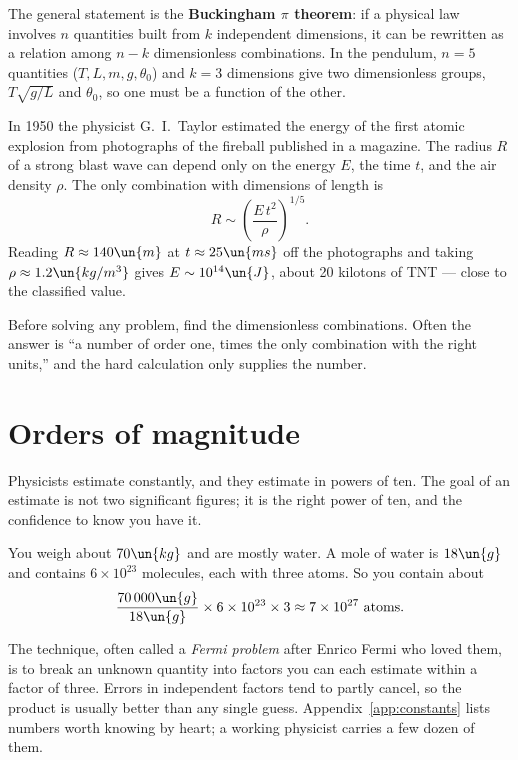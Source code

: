 The general statement is the \textbf{Buckingham $\pi$ theorem}: if a physical law involves $n$ quantities built from $k$ independent dimensions, it can be rewritten as a relation among $n-k$ dimensionless combinations. In the pendulum, $n=5$ quantities ($T, L, m, g, \theta_0$) and $k=3$ dimensions give two dimensionless groups, $T\sqrt{g/L}$ and $\theta_0$, so one must be a function of the other.

\begin{example}
In 1950 the physicist G.~I.~Taylor estimated the energy of the first atomic explosion from photographs of the fireball published in a magazine. The radius $R$ of a strong blast wave can depend only on the energy $E$, the time $t$, and the air density $\rho$. The only combination with dimensions of length is
\[
  R \sim \left(\frac{E\,t^{2}}{\rho}\right)^{1/5}.
\]
Reading $R\approx 140\un{m}$ at $t\approx 25\un{ms}$ off the photographs and taking $\rho\approx1.2\un{kg/m^3}$ gives $E\sim 10^{14}\un{J}$, about 20 kilotons of TNT --- close to the classified value.
\end{example}

\begin{keyidea}
Before solving any problem, find the dimensionless combinations. Often the answer is ``a number of order one, times the only combination with the right units,'' and the hard calculation only supplies the number.
\end{keyidea}

\section{Orders of magnitude}

Physicists estimate constantly, and they estimate in powers of ten. The goal of an estimate is not two significant figures; it is the right power of ten, and the confidence to know you have it.

\begin{example}
You weigh about $70\un{kg}$ and are mostly water. A mole of water is $18\un{g}$ and contains $6\times10^{23}$ molecules, each with three atoms. So you contain about
\[
  \frac{70\,000\un{g}}{18\un{g}}\times 6\times10^{23}\times 3 \approx 7\times10^{27}\ \text{atoms}.
\]
\end{example}

The technique, often called a \emph{Fermi problem} after Enrico Fermi who loved them, is to break an unknown quantity into factors you can each estimate within a factor of three. Errors in independent factors tend to partly cancel, so the product is usually better than any single guess. Appendix~\ref{app:constants} lists numbers worth knowing by heart; a working physicist carries a few dozen of them.

